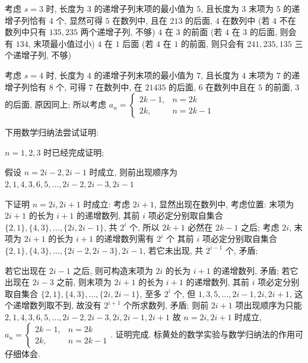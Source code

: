 \begin{solutions}
考虑 $s=3$ 时,
长度为 $3$ 的递增子列末项的最小值为 $5$, 且长度为 $3$ 末项为 $5$ 的递增子列恰有 $4$ 个,
显然可得 $5$ 在数列中, 且在 $213$ 的后面,
$4$ 在数列中 (若 $4$ 不在数列中只有 $135, 235$ 两个递增子列, 不够)
$4$ 在 $3$ 的前面 (若 $4$ 在 $3$ 的后面, 则会有 $134$, 末项最小值过小)
$4$ 在 $1$ 后面 (若 $4$ 在 $1$ 的前面, 则只会有 $241, 235, 135$ 三个递增子列, 不够)

考虑 $s=4$ 时,
长度为 $4$ 的递增子列末项的最小值为 $7$, 且长度为 $4$ 末项为 $7$ 的递增子列恰有 $8$ 个,
可得 $7$ 在数列中, 在 $21435$ 的后面, $6$ 在数列中且在 $5$ 的前面, $3$ 的后面, 原因同上;
所以考虑 $a_n = \begin{cases} 2k-1, & n=2k \\ 2k, & n=2k-1 \end{cases}$

下用数学归纳法尝试证明:

$n=1,2,3$ 时已经完成证明;

假设 $n=2i-2, 2i-1$ 时成立, 则前出现顺序为 $2,1,4,3,6,5,\dots,2i-2,2i-3,2i-1$

下证明 $n=2i, 2i+1$ 时成立:
考虑 $2i+1$, 显然出现在数列中, 考虑位置:
末项为 $2i+1$ 的长为 $i+1$ 的递增数列, 其前 $i$ 项必定分别取自集合 $\{2,1\}, \{4,3\}, \dots, \{2i, 2i-1\}$,
共 $2^i$ 个, 所以 $2k+1$ 必然在 $2k-1$ 之后;
考虑 $2i$, 末项为 $2i+1$ 的长为 $i+1$ 的递增数列需有 $2^i$ 个
其前 $i$ 项必定分别取自集合 $\{2,1\}, \{4,3\}, \dots, \{2i-2, 2i-3\}, 2i-1$,
若它未出现, 共 $2^{i-1}$ 个, 矛盾;

若它出现在 $2i-1$ 之后, 则可构造末项为 $2i$ 的长为 $i+1$ 的递增数列, 矛盾;
若它出现在 $2i-3$ 之前, 则末项为 $2i+1$ 的长为 $i+1$ 的递增数列,
其前 $i$ 项必定分别取自集合 $\{2,1\}, \{4,3\}, \dots, \{2i, 2i-1\}$, 至多 $2^i$ 个,
但 $1,3,5,\dots,2i-1, 2i, 2i+1$, 这个递增数列取不到, 故没有 $2^{i+1}$ 个所求数列, 矛盾;
则前 $2i+1$ 项出现顺序为只能 $2,1,4,3,6,5,\dots,2i-2,2i-3,2i,2i-1,2i+1$
故 $n=2i, 2i+1$ 时成立, $a_n = \begin{cases} 2k-1, & n=2k \\ 2k, & n=2k-1 \end{cases}$. 证明完成.
标黄处的数学实验与数学归纳法的作用可仔细体会.
\end{solutions}